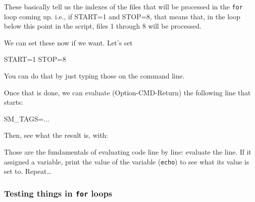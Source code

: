 \documentclass[]{krantz}
\makeatletter
\newenvironment{Shaded}{\begin{snugshade}}{\end{snugshade}}
\newcommand{\BuiltInTok}[1]{#1}
\newcommand{\CommentTok}[1]{\textcolor[rgb]{0.37,0.37,0.37}{\textit{#1}}}
\newcommand{\NormalTok}[1]{#1}
\newcommand{\VariableTok}[1]{\textcolor[rgb]{0,0,0}{#1}}
\newenvironment{kframe}{%
\medskip{}
\setlength{\fboxsep}{.8em}
 \def\at@end@of@kframe{}%
 \ifinner\ifhmode%
  \def\at@end@of@kframe{\end{minipage}}%
  \begin{minipage}{\columnwidth}%
 \fi\fi%
 \def\FrameCommand##1{\hskip\@totalleftmargin \hskip-\fboxsep
 \colorbox{shadecolor}{##1}\hskip-\fboxsep
     \hskip-\linewidth \hskip-\@totalleftmargin \hskip\columnwidth}%
 \MakeFramed {\advance\hsize-\width
   \@totalleftmargin\z@ \linewidth\hsize
   \@setminipage}}%
 {\par\unskip\endMakeFramed%
 \at@end@of@kframe}
\renewenvironment{Shaded}{\begin{kframe}}{\end{kframe}}
\makeatother
\begin{document}
\begin{Shaded}
\end{Shaded}

These basically tell us the indexes of the files that will be processed in the
\texttt{for} loop coming up. i.e., if START=1 and STOP=8, that means that, in the loop
below this point in the script, files 1 through 8 will be processed.

We can set these now if we want. Let's set

\begin{Shaded}
\begin{Highlighting}[]
\VariableTok{START=}\NormalTok{1}
\VariableTok{STOP=}\NormalTok{8}
\end{Highlighting}
\end{Shaded}

You can do that by just typing those on the command line.

Once that is done, we can evaluate (Option-CMD-Return) the following line
that starts:

\begin{Shaded}
\begin{Highlighting}[]
\VariableTok{SM_TAGS=}\NormalTok{...}
\end{Highlighting}
\end{Shaded}

Then, see what the result is, with:

\begin{Shaded}
\end{Shaded}

Those are the fundamentals of evaluating code line by line: evaluate the line. If
it assigned a variable, print the value of the variable (\texttt{echo}) to see what its value
is set to. Repeat\ldots{}

\hypertarget{testing-things-in-for-loops}{%
\subsubsection{\texorpdfstring{Testing things in \texttt{for} loops}{Testing things in for loops}}\label{testing-things-in-for-loops}}
\end{document}
